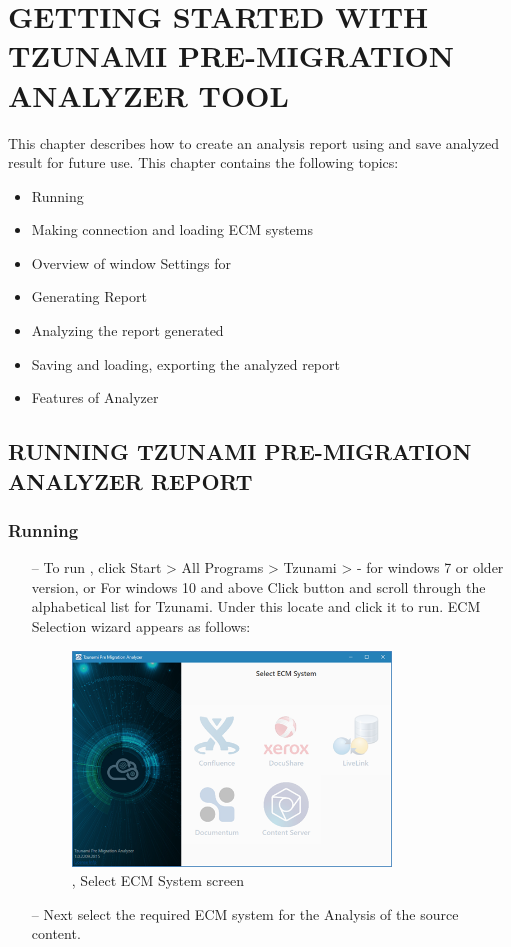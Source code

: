 \chapter{GETTING STARTED WITH TZUNAMI PRE-MIGRATION ANALYZER TOOL}
This chapter describes how to create an analysis report using \appName and save analyzed result for future use. This chapter contains the following topics:
\begin{itemize}
  \item Running \appName
  \item Making connection and loading ECM systems
  \item Overview of \appName window Settings for \appName
  \item Generating Report
  \item Analyzing the report generated
  \item Saving and loading, exporting the analyzed report
  \item Features of Analyzer
\end{itemize}
 \section{RUNNING TZUNAMI PRE-MIGRATION ANALYZER REPORT}

\subsection{Running \appName}
\begin{itemize}
\item[--] To run \appName, click Start > All Programs > Tzunami > \appName - for windows 7 or older version, or
For windows 10 and above
Click    button and scroll through the alphabetical list for Tzunami. Under this locate \appName and click it to run. ECM Selection wizard appears as follows:
\begin{figure} 
  \centering
	\includegraphics[width=0.8\textwidth]{Images/SelectEccmScreen.png}
 \caption{\appName, Select ECM System screen}
\end{figure}
\item[--] Next select the required ECM system for the Analysis of the source content.
\end{itemize}
